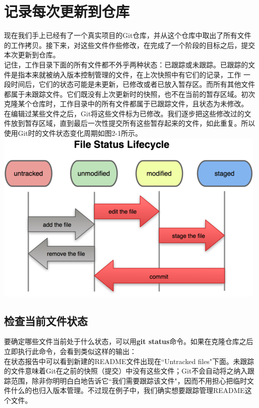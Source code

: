 \documentclass{book}
\begin{document}
	\section{记录每次更新到仓库}
	现在我们手上已经有了一个真实项目的Git仓库，并从这个仓库中取出了所有文件的工作拷贝。接下来，对这些文件作些修改，在完成了一个阶段的目标之后，提交本次更新到仓库。\\
	记住，工作目录下面的所有文件都不外乎两种状态：已跟踪或未跟踪。已跟踪的文件是指本来就被纳入版本控制管理的文件，在上次快照中有它们的记录，工作 一段时间后，它们的状态可能是未更新，已修改或者已放入暂存区。而所有其他文件都属于未跟踪文件。它们既没有上次更新时的快照，也不在当前的暂存区域。初次克隆某个仓库时，工作目录中的所有文件都属于已跟踪文件，且状态为未修改。\\
	在编辑过某些文件之后，Git将这些文件标为已修改。我们逐步把这些修改过的文件放到暂存区域，直到最后一次性提交所有这些暂存起来的文件，如此重复。所以使用Git时的文件状态变化周期如图2-1所示。\\
	\includegraphics{2-1.png}
	\subsection{检查当前文件状态}
	要确定哪些文件当前处于什么状态，可以用\textbf{git status}命令。如果在克隆仓库之后立即执行此命令，会看到类似这样的输出：\\
	在状态报告中可以看到新建的README文件出现在``Untracked files"下面。未跟踪的文件意味着Git在之前的快照（提交）中没有这些文件；Git不会自动将之纳入跟踪范围，除非你明明白白地告诉它``我们需要跟踪该文件"，因而不用担心把临时文件什么的也归入版本管理。不过现在例子中，我们确实想要跟踪管理README这个文件。\\
	
\end{document}
